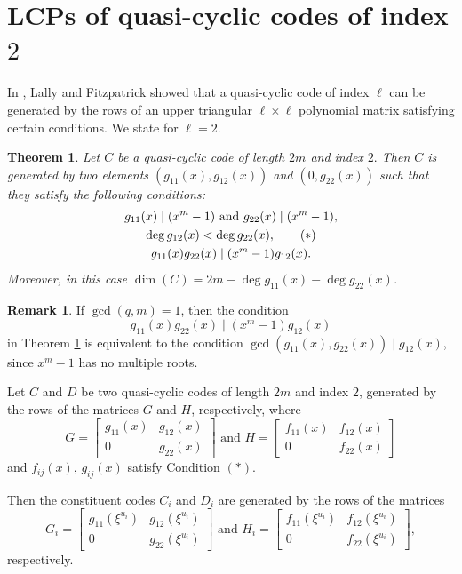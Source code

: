 \documentclass[12 pt]{extarticle}
\numberwithin{equation}{section}
\newtheorem{theorem}{Theorem}[section]
\theoremstyle{definition}
\newtheorem{remark}{Remark}[section]
\begin{document}
\section{LCPs of quasi-cyclic codes of index $2$}\label{secgen2lcp}
In \cite{lally2001,Abdukhalikov20251}, Lally and Fitzpatrick showed that a quasi-cyclic code of index $\ell$ can be generated by the rows of an upper triangular $\ell \times \ell$  polynomial matrix satisfying certain conditions. We state for $\ell=2$.
\begin{theorem} \label{qc2}
Let $C$ be a quasi-cyclic code of length $2m$ and index $2.$ 
Then $C$ is generated by two elements $(g_{11}(x), g_{12}(x))$ and $(0, g_{22}(x))$ such that they satisfy the following conditions: 
\begin{gather}  
g_{11}(x) \mid (x^m-1) \text{ and } g_{22}(x) \mid(x^m-1), \notag \\
\deg g_{12}(x) < \deg g_{22}(x), \tag{$\ast$}\\
g_{11}(x)g_{22}(x) \mid (x^m-1)g_{12}(x). \notag
\end{gather}
 Moreover, in this case $\dim (C) = 2m-\deg g_{11}(x)-\deg g_{22}(x)$.
\end{theorem}

\begin{remark} \label{remarkgcd}   If $\gcd(q,m)=1$, then the condition 
$$g_{11}(x)g_{22}(x) \mid (x^m-1)g_{12}(x)$$ 
in Theorem \ref{qc2} is equivalent to the condition $\gcd(g_{11}(x),g_{22}(x)) \mid g_{12}(x)$, since $x^m-1$ has no multiple roots.
\end{remark}



 



Let $C$ and $D$ be two quasi-cyclic codes of length $2m$ and index $2$, generated by the rows of the matrices $G$ and $H$, respectively, where 
\begin{equation*}
    G= \begin{bmatrix}
    g_{11}(x)&g_{12}(x)\\
    0& g_{22}(x)
\end{bmatrix} \text{ and } H= \begin{bmatrix}
    f_{11}(x)&f_{12}(x)\\
    0& f_{22}(x)
\end{bmatrix}
\end{equation*}
and $f_{ij}(x)$, $g_{ij}(x)$ satisfy Condition $(\ast)$.

Then the constituent codes $C_i$ and $D_i$ are generated by the rows of the matrices
$$
G_i=  \begin{bmatrix}
g_{11}(\xi^{u_i}) & g_{12}(\xi^{u_i}) \\
0 & g_{22}(\xi^{u_i}) 
\end{bmatrix} \text{ and }
H_i=  \begin{bmatrix}
f_{11}(\xi^{u_i}) & f_{12}(\xi^{u_i}) \\
0 & f_{22}(\xi^{u_i}) 
\end{bmatrix},$$
respectively. 
\end{document}
